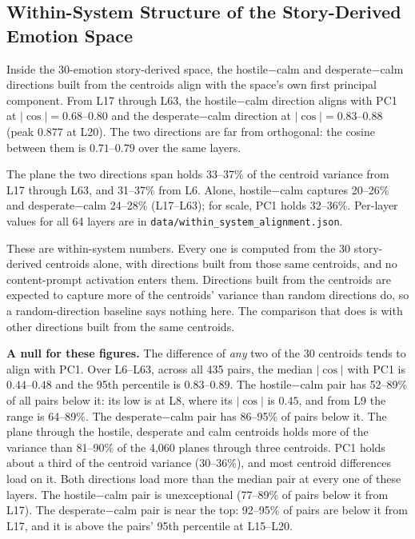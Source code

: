 \documentclass[11pt,a4paper]{article}
\begin{document}
\subsection{Within-System Structure of the Story-Derived Emotion Space}
\label{sec:results-subspace}

Inside the 30-emotion story-derived space, the hostile$-$calm and desperate$-$calm directions built from the centroids align with the space's own first principal component. From L17 through L63, the hostile$-$calm direction aligns with PC1 at $|\cos| = 0.68$--$0.80$ and the desperate$-$calm direction at $|\cos| = 0.83$--$0.88$ (peak $0.877$ at L20). The two directions are far from orthogonal: the cosine between them is $0.71$--$0.79$ over the same layers.

The plane the two directions span holds 33--37\% of the centroid variance from L17 through L63, and 31--37\% from L6. Alone, hostile$-$calm captures 20--26\% and desperate$-$calm 24--28\% (L17--L63); for scale, PC1 holds 32--36\%. Per-layer values for all 64 layers are in \texttt{data/\allowbreak within\_system\_alignment.json}.

These are within-system numbers. Every one is computed from the 30 story-derived centroids alone, with directions built from those same centroids, and no content-prompt activation enters them. Directions built from the centroids are expected to capture more of the centroids' variance than random directions do, so a random-direction baseline says nothing here. The comparison that does is with other directions built from the same centroids.

\textbf{A null for these figures.} The difference of \emph{any} two of the 30 centroids tends to align with PC1. Over L6--L63, across all 435 pairs, the median $|\cos|$ with PC1 is $0.44$--$0.48$ and the 95th percentile is $0.83$--$0.89$. The hostile$-$calm pair has 52--89\% of all pairs below it: its low is at L8, where its $|\cos|$ is $0.45$, and from L9 the range is 64--89\%. The desperate$-$calm pair has 86--95\% of pairs below it. The plane through the hostile, desperate and calm centroids holds more of the variance than 81--90\% of the 4,060 planes through three centroids. PC1 holds about a third of the centroid variance (30--36\%), and most centroid differences load on it. Both directions load more than the median pair at every one of these layers. The hostile$-$calm pair is unexceptional (77--89\% of pairs below it from L17). The desperate$-$calm pair is near the top: 92--95\% of pairs are below it from L17, and it is above the pairs' 95th percentile at L15--L20.
\end{document}
